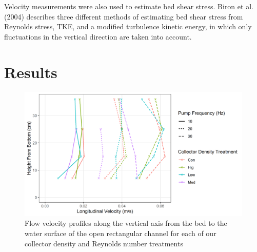 \documentclass{scrreprt}
\newcommand\Rey{\mathrm{Re}}
\begin{document}
Velocity measurements were also used to estimate bed shear stress. Biron et al. (2004) describes three different methods of estimating bed shear stress from Reynolds stress, TKE, and a modified turbulence kinetic energy, in which only fluctuations in the vertical direction are taken into account.%


\chapter{Results}

\begin{figure}[htbp]
\includegraphics[width=6in]{vectrino.png}
\centering
\caption{Flow velocity profiles along the vertical axis from the bed to the water surface of the open rectangular channel for each of our collector density and Reynolds number treatments}
\label{fig:vectrino}
\end{figure}

%
%



\end{document}

